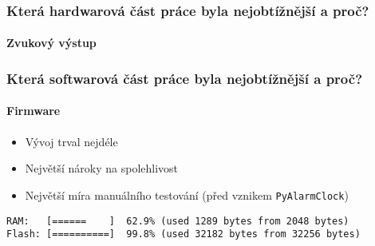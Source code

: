 \documentclass[
    utf8,
    aspectratio=169,
    17pt,  %
]{beamer}
\newcommand{\fullsizegraphics}[2][]{%
    \centering%
    \texttt{[image: \#2]}%
}
\begin{document}
\begin{frame}
    \frametitle{Která hardwarová část práce byla nejobtížnější a proč?}
    \framesubtitle{Zvukový výstup}
    \only<2>{\fullsizegraphics{zvuk-stul1}}
    \only<3>{\fullsizegraphics{zvuk-stul2}}
\end{frame}


\begin{frame}[fragile]
    \frametitle{Která softwarová část práce byla nejobtížnější a proč?}
    \framesubtitle{Firmware}
    \begin{itemize}
        \item Vývoj trval nejdéle
        \item Největší nároky na spolehlivost
        \item Největší míra manuálního testování (před vznikem
            \texttt{PyAlarmClock})
    \end{itemize}
    {
        \footnotesize
        \begin{lstlisting}[style=terminal]
RAM:   [======    ]  62.9% (used 1289 bytes from 2048 bytes)
Flash: [==========]  99.8% (used 32182 bytes from 32256 bytes)
        \end{lstlisting}
    }
\end{frame}
\end{document}
